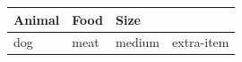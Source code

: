 \documentclass{article}
\begin{document}
\begin{tabular}{lll}
\toprule
Animal & Food & Size \\
\midrule
dog & meat & medium & extra-item \\
\end{tabular}
\end{document}
